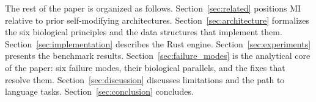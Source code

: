 The rest of the paper is organized as follows. Section~\ref{sec:related} positions MI relative to prior self-modifying architectures. Section~\ref{sec:architecture} formalizes the six biological principles and the data structures that implement them. Section~\ref{sec:implementation} describes the Rust engine. Section~\ref{sec:experiments} presents the benchmark results. Section~\ref{sec:failure_modes} is the analytical core of the paper: six failure modes, their biological parallels, and the fixes that resolve them. Section~\ref{sec:discussion} discusses limitations and the path to language tasks. Section~\ref{sec:conclusion} concludes.
